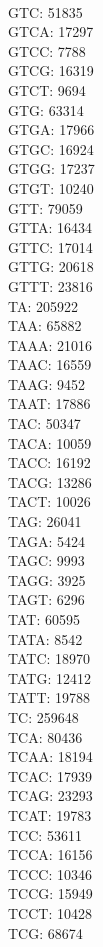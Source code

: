 \begin{multicols}{7}
\\ GTC:	51835
\\ GTCA:	17297
\\ GTCC:	7788
\\ GTCG:	16319
\\ GTCT:	9694
\\ GTG:	63314
\\ GTGA:	17966
\\ GTGC:	16924
\\ GTGG:	17237
\\ GTGT:	10240
\\ GTT:	79059
\\ GTTA:	16434
\\ GTTC:	17014
\\ GTTG:	20618
\\ GTTT:	23816
\\ TA:	205922
\\ TAA:	65882
\\ TAAA:	21016
\\ TAAC:	16559
\\ TAAG:	9452
\\ TAAT:	17886
\\ TAC:	50347
\\ TACA:	10059
\\ TACC:	16192
\\ TACG:	13286
\\ TACT:	10026
\\ TAG:	26041
\\ TAGA:	5424
\\ TAGC:	9993
\\ TAGG:	3925
\\ TAGT:	6296
\\ TAT:	60595
\\ TATA:	8542
\\ TATC:	18970
\\ TATG:	12412
\\ TATT:	19788
\\ TC:	259648
\\ TCA:	80436
\\ TCAA:	18194
\\ TCAC:	17939
\\ TCAG:	23293
\\ TCAT:	19783
\\ TCC:	53611
\\ TCCA:	16156
\\ TCCC:	10346
\\ TCCG:	15949
\\ TCCT:	10428
\\ TCG:	68674

\end{multicols}
